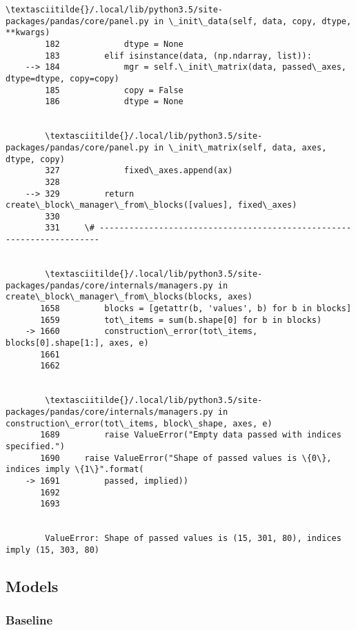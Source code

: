 \documentclass[11pt]{article}
\begin{document}
\begin{Verbatim}[commandchars=\\\{\}]
        \textasciitilde{}/.local/lib/python3.5/site-packages/pandas/core/panel.py in \_init\_data(self, data, copy, dtype, **kwargs)
        182             dtype = None
        183         elif isinstance(data, (np.ndarray, list)):
    --> 184             mgr = self.\_init\_matrix(data, passed\_axes, dtype=dtype, copy=copy)
        185             copy = False
        186             dtype = None


        \textasciitilde{}/.local/lib/python3.5/site-packages/pandas/core/panel.py in \_init\_matrix(self, data, axes, dtype, copy)
        327             fixed\_axes.append(ax)
        328 
    --> 329         return create\_block\_manager\_from\_blocks([values], fixed\_axes)
        330 
        331     \# ----------------------------------------------------------------------


        \textasciitilde{}/.local/lib/python3.5/site-packages/pandas/core/internals/managers.py in create\_block\_manager\_from\_blocks(blocks, axes)
       1658         blocks = [getattr(b, 'values', b) for b in blocks]
       1659         tot\_items = sum(b.shape[0] for b in blocks)
    -> 1660         construction\_error(tot\_items, blocks[0].shape[1:], axes, e)
       1661 
       1662 


        \textasciitilde{}/.local/lib/python3.5/site-packages/pandas/core/internals/managers.py in construction\_error(tot\_items, block\_shape, axes, e)
       1689         raise ValueError("Empty data passed with indices specified.")
       1690     raise ValueError("Shape of passed values is \{0\}, indices imply \{1\}".format(
    -> 1691         passed, implied))
       1692 
       1693 


        ValueError: Shape of passed values is (15, 301, 80), indices imply (15, 303, 80)

    \end{Verbatim}

    \subsection{Models}\label{models}

    \subsubsection{Baseline}\label{baseline}
\end{document}
